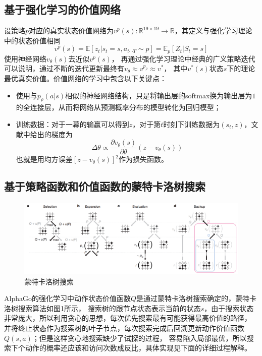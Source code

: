 \documentclass[12pt, a4paper, oneside]{ctexart}
\numberwithin{equation}{section}  %
\def\R{\mathbb{R}}          %
\def\E{\mathbb{E}}          %
\begin{document}
\subsection{基于强化学习的价值网络}
设策略$p$对应的真实状态价值网络为$v^p(s):\R^{19\times 19}\to \R$，其定义与强化学习理论中的状态价值相同
\begin{equation*}
    v^p(s) = \E[z_t | s_t = s, a_{t\cdots T}\sim p] = \E_p[Z_t | S_t = s]
\end{equation*}
使用神经网络$v_\theta(s)$去近似$v^p(s)$，
再通过强化学习理论中经典的广义策略迭代可以说明，通过不断的迭代更新最终有$v_{\theta}\approx v^{p_{\rho}}\approx v^*$，
其中$v^*(s)$状态$s$下的理论最优真实价值。价值网络的学习中包含以下关键点：

\begin{itemize}
    \item 使用与$p_{\rho}(a|s)$相似的神经网络结构，只是将输出层的softmax换为输出层为$1$的全连接层，从而将网络从预测概率分布的模型转化为回归模型；
    \item 训练数据：对于一幕的输赢可以得到$z$，对于第$t$时刻下训练数据为$(s_t,z)$，文献中给出的梯度为
    \begin{equation*}
        \Delta\theta\propto \frac{\partial v_{\theta}(s)}{\partial \theta}(z-v_{\theta}(s))
    \end{equation*}
    也就是用均方误差$[z-v_{\theta}(s)]^2$作为损失函数。
\end{itemize}
\subsection{基于策略函数和价值函数的蒙特卡洛树搜索}
\begin{figure}[htbp]
    \hspace{-1cm}
    \includegraphics[scale=0.3]{./figures/AlphaGo蒙特卡洛树搜索.png}
    \caption{蒙特卡洛树搜索}
\end{figure}
AlphaGo的强化学习中动作状态价值函数$Q$是通过蒙特卡洛树搜索确定的，蒙特卡洛树搜索算法如图1所示，
搜索树的跟节点状态表示当前的状态$s$，由于搜索状态非常庞大，所以利用贪心的思想，每次优先搜索最有可能获得最高价值的路径，
并将终止状态作为搜索树的叶子节点，每次搜索完成后回溯更新动作价值函数$Q(s,a)$；但是这样贪心地搜索缺少了试探的过程，
容易陷入局部最优，所以搜索下个动作的概率还应该和访问次数成反比，具体实现见下面的详细过程解释。
\end{document}
